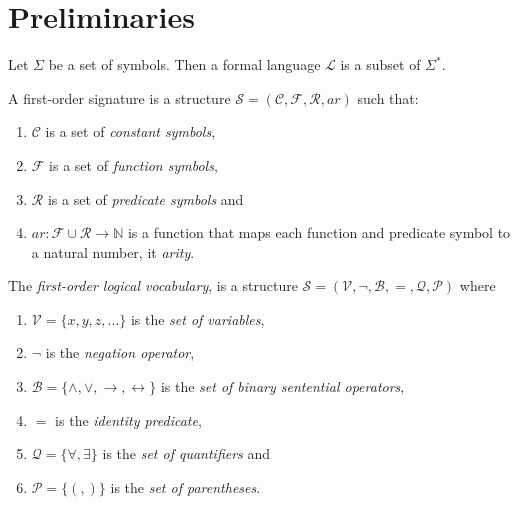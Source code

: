 \chapter{Preliminaries}

\begin{definition}
    Let $\Sigma$ be a set of symbols. Then a formal language $\mathcal{L}$ is a subset of $\Sigma^*$.
\end{definition}

\begin{definition}
    A first-order signature is a structure $\mathcal{S} = (\mathcal{C},\mathcal{F},\mathcal{R},ar)$ such that:
    \begin{enumerate}
        \item $\mathcal{C}$ is a set of \textit{constant symbols},
        \item $\mathcal{F}$ is a set of \textit{function symbols},
        \item $\mathcal{R}$ is a set of \textit{predicate symbols} and
        \item $ar : \mathcal{F} \cup \mathcal{R} \to \mathbb{N}$ is a function that maps each function and predicate symbol to a natural number, it \textit{arity}.
    \end{enumerate}
\end{definition}

\begin{definition}
    The \textit{first-order logical vocabulary}, is a structure $\mathcal{S} = (\mathcal{V},\neg,\mathcal{B},=,\mathcal{Q},\mathcal{P})$ where
    \begin{enumerate}
        \item $\mathcal{V} = \{x,y,z,...\}$ is the \textit{set of variables},
        \item $\neg$ is the \textit{negation operator},
        \item $\mathcal{B} = \{\land,\lor,\to,\leftrightarrow\}$ is the \textit{set of binary sentential operators},
        \item $=$ is the \textit{identity predicate},
        \item $\mathcal{Q} = \{\forall, \exists\}$ is the \textit{set of quantifiers} and
        \item $\mathcal{P} = \{(,)\}$ is the \textit{set of parentheses}.
    \end{enumerate}
\end{definition}


